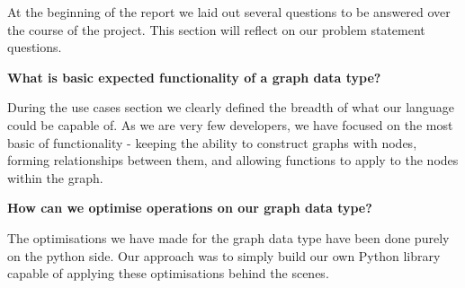 At the beginning of the report we laid out several questions to be answered over the course of the project.
This section will reflect on our problem statement questions.

\textbf{What is basic expected functionality of a graph data type?}

During the use cases section we clearly defined the breadth of what our language could be capable of.
As we are very few developers, we have focused on the most basic of functionality - keeping the ability to construct
graphs with nodes, forming relationships between them, and allowing functions to apply to the nodes within the graph.

\textbf{How can we optimise operations on our graph data type?}

The optimisations we have made for the graph data type have been done purely on the python side.
Our approach was to simply build our own Python library capable of applying these optimisations behind the scenes.